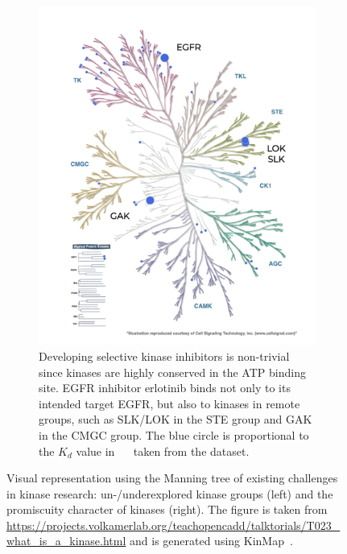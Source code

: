 \documentclass[9pt,training]{livecoms}
\begin{document}
\begin{figure}
\begin{subfigure}[b]{0.45\textwidth}
         \includegraphics[width=\textwidth]{kinmap_erlotinib_karaman.png}
         \caption{Developing selective kinase inhibitors is non-trivial since kinases are highly conserved in the ATP binding site. EGFR inhibitor erlotinib binds not only to its intended target EGFR, but also to kinases in remote groups, such as SLK/LOK in the STE group and GAK in the CMGC group. The blue circle is proportional to the $K_d$ value in \SI{}{\nano\Molar} taken from the \citet{Karaman_2008_NatBiotechnol} dataset.}
         \label{fig:off_target}
     \end{subfigure}
        \caption{Visual representation using the Manning tree of existing challenges in kinase research: un-/underexplored kinase groups (left) and the promiscuity character of kinases (right). The figure is taken from \href{https://projects.volkamerlab.org/teachopencadd/talktorials/T023\_what\_is\_a\_kinase.html}{https://projects.volkamerlab.org/teachopencadd/talktorials/T023\_what\_is\_a\_kinase.html} and is generated using KinMap~\cite{Eid_2017_BMCBioinformatics}.}
        \label{fig:kinmap}
\end{figure}
\end{document}
